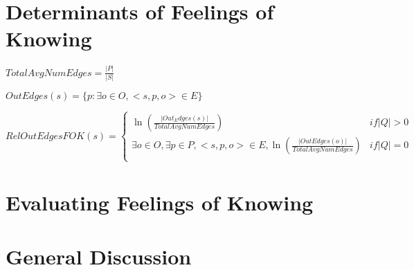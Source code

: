 \documentclass[10pt,letterpaper]{article}
\begin{document}
\section{Determinants of Feelings of Knowing}
$TotalAvgNumEdges= \frac{|P|}{|S|}$

\noindent$OutEdges(s) = \{p : \exists o{\in}O, <s, p, o>{\in}E \}$

\noindent$$RelOutEdgesFOK(s) =
\begin{cases}
				\ln (\frac{|Out_Edges(s)|}{TotalAvgNumEdges}) & {if |Q| > 0} \\
				\exists o{\in}O, \exists p{\in}P, <s, p, o>{\in}E, \ln(\frac{|OutEdges(o)|}{TotalAvgNumEdges}) & {if |Q| = 0} \\
\end{cases}
$$

\section{Evaluating Feelings of Knowing}

\section{General Discussion}


%



\setlength{\bibleftmargin}{.125in}
\setlength{\bibindent}{-\bibleftmargin}


\end{document}
